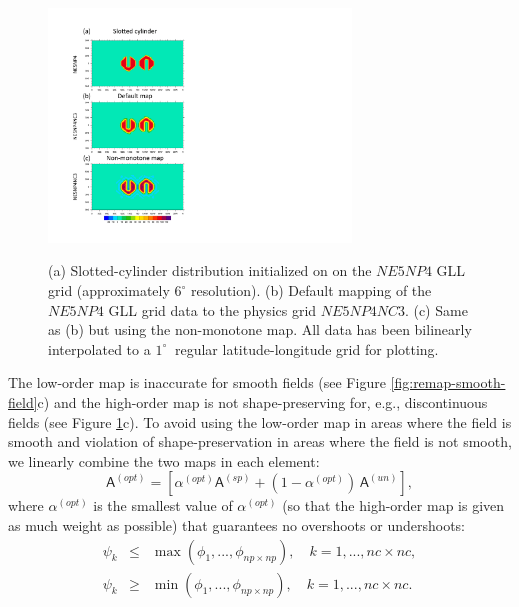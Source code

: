 \begin{figure}[t]
\noindent\includegraphics[width=19pc,angle=0]{figs/idealized-mapping-tests-slotted-cylinder.pdf}\\
  \caption{(a) Slotted-cylinder distribution initialized on on the $NE5NP4$ GLL grid (approximately $6^\circ$ resolution). (b) Default mapping of the $NE5NP4$ GLL grid data to the physics grid $NE5NP4NC3$. (c) Same as (b) but using the non-monotone map. All data has been bilinearly interpolated to a $1^\circ\
$ regular latitude-longitude grid for plotting.}\label{fig:remap-slotted-cylinder}
\end{figure}
The low-order map is inaccurate for smooth fields (see Figure \ref{fig:remap-smooth-field}c) and the high-order map is not shape-preserving for, e.g., discontinuous fields (see Figure \ref{fig:remap-slotted-cylinder}c). To avoid using the low-order map in areas where the field is smooth and violation of shape-preservation in areas where the field is not smooth, we linearly combine the two maps in each element:
\begin{equation}
\bm{\mathsf{A}}^{(opt)}=\left[ \alpha^{(opt)} \bm{\mathsf{A}}^{(sp)}+(1-\alpha^{(opt)})\, \bm{\mathsf{A}}^{(un)}\right],\label{eq:opt}
\end{equation}
where $\alpha^{(opt)}$ is the smallest value of $\alpha^{(opt)}$ (so that the high-order map is given as much weight as possible) that guarantees no overshoots or undershoots:
\begin{eqnarray}
\psi_k&\le &\max(\phi_1,...,\phi_{np\times np}), \quad k=1,...,nc\times nc,\label{eq:overshoot}\\
\psi_k&\ge &\min(\phi_1,...,\phi_{np\times np}), \quad k=1,...,nc\times nc.\label{eq:undershoot}
\end{eqnarray}
